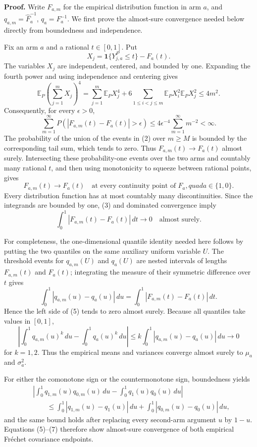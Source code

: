 \textbf{Proof.}
Write \(F_{a,m}\) for the empirical distribution function in arm \(a\), and \(q_{a,m}=\widehat F_a^{-1}\), \(q_a=F_a^{-1}\).  We first prove the almost-sure convergence needed below directly from boundedness and independence.

Fix an arm \(a\) and a rational \(t\in[0,1]\).  Put
\[
X_j=\mathbf1\{Y^P_{j,a}\le t\}-F_a(t).
\]
The variables \(X_j\) are independent, centered, and bounded by one.  Expanding the fourth power and using independence and centering gives
\[
\mathbb E_P\!\left(\sum_{j=1}^mX_j\right)^4
=\sum_{j=1}^m\mathbb E_PX_j^4
+6\sum_{1\le i<j\le m}
\mathbb E_PX_i^2\mathbb E_PX_j^2
\le4m^2.
\tag{1}
\]
Consequently, for every \(\epsilon>0\),
\[
\sum_{m=1}^{\infty}
P\!\left(\left|F_{a,m}(t)-F_a(t)\right|>\epsilon\right)
\le4\epsilon^{-4}\sum_{m=1}^{\infty}m^{-2}<\infty.
\tag{2}
\]
The probability of the union of the events in (2) over \(m\ge M\) is bounded by the corresponding tail sum, which tends to zero.  Thus \(F_{a,m}(t)\to F_a(t)\) almost surely.  Intersecting these probability-one events over the two arms and countably many rational \(t\), and then using monotonicity to squeeze between rational points, gives
\[
F_{a,m}(t)\longrightarrow F_a(t)
\quad\text{at every continuity point of }F_a,quad a\in\{1,0\}.
\tag{3}
\]
Every distribution function has at most countably many discontinuities.  Since the integrands are bounded by one, (3) and dominated convergence imply
\[
\int_0^1|F_{a,m}(t)-F_a(t)|\,dt\longrightarrow0
\quad\text{almost surely}.
\tag{4}
\]

For completeness, the one-dimensional quantile identity needed here follows by putting the two quantiles on the same auxiliary uniform variable \(U\).  The threshold events for \(q_{a,m}(U)\) and \(q_a(U)\) are nested intervals of lengths \(F_{a,m}(t)\) and \(F_a(t)\); integrating the measure of their symmetric difference over \(t\) gives
\[
\int_0^1|q_{a,m}(u)-q_a(u)|\,du
=\int_0^1|F_{a,m}(t)-F_a(t)|\,dt.
\tag{5}
\]
Hence the left side of (5) tends to zero almost surely.  Because all quantiles take values in \([0,1]\),
\[
\left|\int_0^1q_{a,m}(u)^k\,du
-\int_0^1q_a(u)^k\,du\right|
\le k\int_0^1|q_{a,m}(u)-q_a(u)|\,du
\longrightarrow0
\tag{6}
\]
for \(k=1,2\).  Thus the empirical means and variances converge almost surely to \(\mu_a\) and \(\sigma_a^2\).

For either the comonotone sign or the countermonotone sign, boundedness yields
\[
\begin{aligned}
&\left|\int_0^1q_{1,m}(u)q_{0,m}(u)\,du
-\int_0^1q_1(u)q_0(u)\,du\right|\\
&\qquad\le
\int_0^1|q_{1,m}(u)-q_1(u)|\,du
+\int_0^1|q_{0,m}(u)-q_0(u)|\,du,
\end{aligned}
\tag{7}
\]
and the same bound holds after replacing every second-arm argument \(u\) by \(1-u\).  Equations (5)--(7) therefore show almost-sure convergence of both empirical Fr\'echet covariance endpoints.

